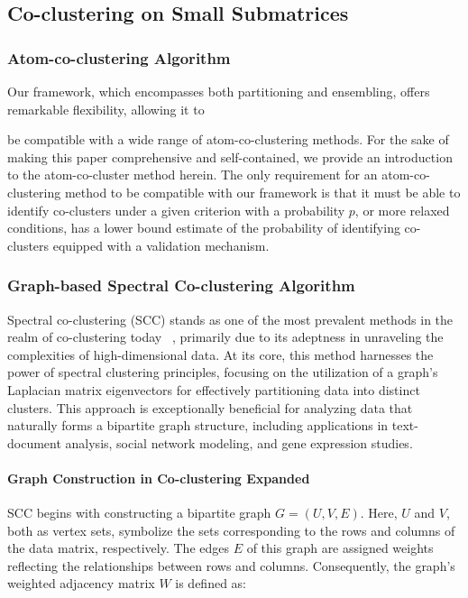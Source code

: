 \documentclass[journal]{IEEEtran}
\renewcommand{\cite}[1]{~\autocite{#1}}
\begin{document}
\subsection{Co-clustering on Small Submatrices}

\subsubsection{Atom-co-clustering Algorithm}

Our framework, which encompasses both partitioning and ensembling, offers remarkable flexibility, allowing it to

be compatible with a wide range of atom-co-clustering methods. For the sake of making this paper comprehensive and self-contained, we provide an introduction to the atom-co-cluster method herein. The only requirement for an atom-co-clustering method to be compatible with our framework is that it must be able to identify co-clusters under a given criterion with a probability $p$, or more relaxed conditions, has a lower bound estimate of the probability of identifying co-clusters equipped with a validation mechanism.

\subsubsection{Graph-based Spectral Co-clustering Algorithm}

Spectral co-clustering (SCC) stands as one of the most prevalent methods in the realm of co-clustering today \cite{vonluxburg2007TutorialSpectralClustering}, primarily due to its adeptness in unraveling the complexities of high-dimensional data. At its core, this method harnesses the power of spectral clustering principles, focusing on the utilization of a graph's Laplacian matrix eigenvectors for effectively partitioning data into distinct clusters. This approach is exceptionally beneficial for analyzing data that naturally forms a bipartite graph structure, including applications in text-document analysis, social network modeling, and gene expression studies.

\paragraph{Graph Construction in Co-clustering Expanded}

SCC begins with constructing a bipartite graph $G=(U,V,E)$. Here, $U$ and $V$, both as vertex sets, symbolize the sets corresponding to the rows and columns of the data matrix, respectively. The edges $E$ of this graph are assigned weights reflecting the relationships between rows and columns. Consequently, the graph's weighted adjacency matrix $W$ is defined as:
\end{document}
